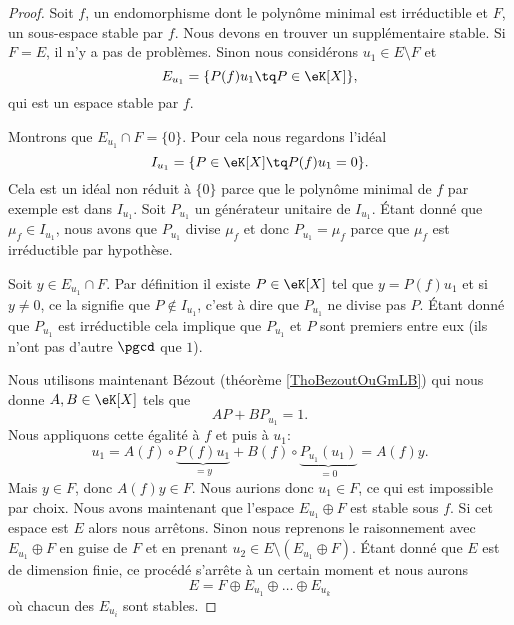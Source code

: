 \begin{proof}
    Soit \( f\), un endomorphisme dont le polynôme minimal est irréductible et \( F\), un sous-espace stable par \( f\). Nous devons en trouver un supplémentaire stable. Si \( F=E\), il n'y a pas de problèmes. Sinon nous considérons \( u_1\in E\setminus F\) et
    \begin{equation}
        E_{u_1}=\{ P(f)u_1\tq P\in \eK[X] \},
    \end{equation}
    qui est un espace stable par \( f\). 

    Montrons que \( E_{u_1}\cap F=\{ 0 \}\). Pour cela nous regardons l'idéal
    \begin{equation}
        I_{u_1}=\{ P\in \eK[X]\tq P(f)u_1=0 \}.
    \end{equation}
    Cela est un idéal non réduit à \( \{ 0 \}\) parce que le polynôme minimal de \( f\) par exemple est dans \( I_{u_1}\). Soit \( P_{u_1}\) un générateur unitaire de \( I_{u_1}\). Étant donné que \( \mu_f\in I_{u_1}\), nous avons que \( P_{u_1}\) divise \( \mu_f\) et donc \( P_{u_1}=\mu_f\) parce que \( \mu_f\) est irréductible par hypothèse.

    Soit \( y\in E_{u_1}\cap F\). Par définition il existe \( P\in\eK[X]\) tel que \( y=P(f)u_1\) et si \( y\neq 0\), ce la signifie que \( P\notin I_{u_1}\), c'est à dire que \( P_{u_1} \) ne divise pas \( P\). Étant donné que \( P_{u_1}\) est irréductible cela implique que \( P_{u_1}\) et \( P\) sont premiers entre eux (ils n'ont pas d'autre \( \pgcd\) que \( 1\)).

    Nous utilisons maintenant Bézout (théorème \ref{ThoBezoutOuGmLB}) qui nous donne \( A,B\in \eK[X]\) tels que 
    \begin{equation}
        AP+BP_{u_1}=1.
    \end{equation}
    Nous appliquons cette égalité à \( f\) et puis à \( u_1\):
    \begin{equation}
        u_1=A(f)\circ \underbrace{P(f)u_1}_{=y}+B(f)\circ \underbrace{P_{u_1}(u_1)}_{=0}=A(f)y.
    \end{equation}
    Mais \( y\in F\), donc \( A(f)y\in F\). Nous aurions donc \( u_1\in F\), ce qui est impossible par choix. Nous avons maintenant que l'espace \( E_{u_1}\oplus F\) est stable sous \( f\). Si cet espace est \( E\) alors nous arrêtons. Sinon nous reprenons le raisonnement avec \( E_{u_1}\oplus F\) en guise de \( F\) et en prenant \( u_2\in E\setminus(E_{u_1}\oplus F)\). Étant donné que \( E\) est de dimension finie, ce procédé s'arrête à un certain moment et nous aurons
    \begin{equation}
        E=F\oplus E_{u_1}\oplus\ldots\oplus E_{u_k}
    \end{equation}
    où chacun des \( E_{u_i}\) sont stables.
\end{proof}

